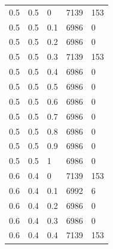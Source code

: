 \documentclass[12pt,a4paper]{report}
\begin{document}
\begin{table}[ht!]
\begin{tabular}{ | l | l | l | l | l |}
		0.5      & 0.5     & 0   & 7139      & 153     \\
		0.5      & 0.5     & 0.1 & 6986      & 0       \\
		0.5      & 0.5     & 0.2 & 6986      & 0       \\
		0.5      & 0.5     & 0.3 & 7139      & 153     \\
		0.5      & 0.5     & 0.4 & 6986      & 0       \\
		0.5      & 0.5     & 0.5 & 6986      & 0       \\
		0.5      & 0.5     & 0.6 & 6986      & 0       \\
		0.5      & 0.5     & 0.7 & 6986      & 0       \\
		0.5      & 0.5     & 0.8 & 6986      & 0       \\
		0.5      & 0.5     & 0.9 & 6986      & 0       \\
		0.5      & 0.5     & 1   & 6986      & 0       \\
		0.6      & 0.4     & 0   & 7139      & 153     \\
		0.6      & 0.4     & 0.1 & 6992      & 6       \\
		0.6      & 0.4     & 0.2 & 6986      & 0       \\
		0.6      & 0.4     & 0.3 & 6986      & 0       \\
		0.6      & 0.4     & 0.4 & 7139      & 153     \\
		
		\hline
	\end{tabular}
\end{table}
\end{document}
